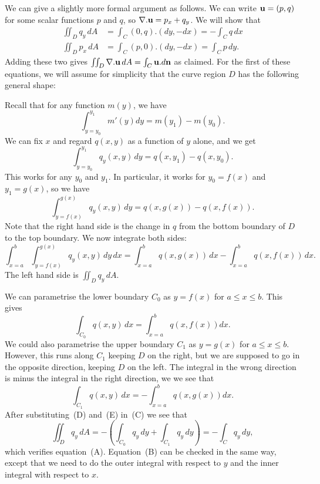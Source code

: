 \documentclass[reqno]{amsart}
\theoremstyle{definition}
\begin{document}
We can give a slightly more formal argument as follows.  We can write
$\mathbf{u}=(p,q)$ for some scalar functions $p$ and $q$, so
$\nabla.\mathbf{u}=p_x+q_y$.  We will show that
\begin{align*}
 \iint_D q_y\,dA &= \int_C (0,q).(dy,-dx) = -\int_C q\,dx \tag{A}\\
 \iint_D p_x\,dA &= \int_C (p,0).(dy,-dx) = \int_C p\,dy. \tag{B}
\end{align*}
Adding these two gives $\iint_D\nabla.\mathbf{u}\,dA=\int_C\mathbf{u}.d\mathbf{n}$ as
claimed.  For the first of these equations, we will assume for
simplicity that the curve region $D$ has the following general shape:
\begin{center}
\end{center}

Recall that for any function $m(y)$, we have 
\[ \int_{y=y_0}^{y_1}m'(y)dy= m(y_1) - m(y_0). \]
We can fix $x$ and regard $q(x,y)$ as a function of $y$ alone, and we
get 
\[ \int_{y=y_0}^{y_1} q_y(x,y) \, dy = q(x,y_1) - q(x,y_0). \]
This works for any $y_0$ and $y_1$.  In particular, it works for
$y_0=f(x)$ and $y_1=g(x)$, so we have 
\[ \int_{y=f(x)}^{g(x)} q_y(x,y) \, dy = q(x,g(x)) - q(x,f(x)). \]
Note that the right hand side is the change in $q$ from the bottom
boundary of $D$ to the top boundary.  We now integrate both sides:
\[ \int_{x=a}^b\int_{y=f(x)}^{g(x)} q_y(x,y) \,dy\,dx =
    \int_{x=a}^b q(x,g(x))\,dx - \int_{x=a}^b q(x,f(x))\,dx. 
     \tag{C}
\]
The left hand side is $\iint_D q_y\,dA$.  

We can parametrise the lower boundary $C_0$ as $y=f(x)$ for $a\leq x\leq b$.
This gives 
\[ \int_{C_0} q(x,y) \,dx = \int_{x=a}^b q(x,f(x)) dx. \tag{D} \]
We could also parametrise the upper boundary $C_1$ as $y=g(x)$ for
$a\leq x\leq b$.  However, this runs along $C_1$ keeping $D$ on the
right, but we are supposed to go in the opposite direction, keeping
$D$ on the left.  The integral in the wrong direction is minus the
integral in the right direction, we we see that 
\[ \int_{C_1} q(x,y) \,dx = -\int_{x=a}^b q(x,g(x)) dx. \tag{E} \]
After substituting~(D) and~(E) in~(C) we see that
\[ \iint_D q_y\,dA =
     -\left(\int_{C_0}q_y\,dy + \int_{C_1}q_y\,dy\right) = 
      -\int_C q_y\,dy,
\]
which verifies equation~(A).  Equation~(B) can be checked in the same
way, except that we need to do the outer integral with respect to $y$
and the inner integral with respect to $x$.
\end{document}
